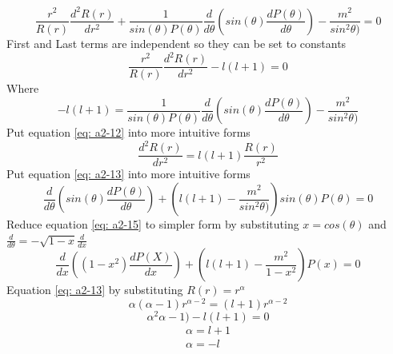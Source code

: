 \documentclass[12pt]{article}
\begin{document}
        \begin{equation} \label{eq: a2-11}
            \frac{r^2}{R(r)} \frac{d^2 R(r)}{dr^2} + \frac{1}{sin(\theta) P(\theta)} \frac{d}{d\theta}(sin(\theta) \frac{dP(\theta)}{d\theta}) - \frac{m^2}{sin^2\theta)} = 0
        \end{equation}
        First and Last terms are independent so they can be set to constants
        \begin{equation} \label{eq: a2-12}
            \frac{r^2}{R(r)} \frac{d^2 R(r)}{dr^2} - l (l+1) = 0
        \end{equation}
        Where 
        \begin{equation} \label{eq: a2-13}
            -l(l+1) = \frac{1}{sin(\theta) P(\theta)} \frac{d}{d\theta}(sin(\theta) \frac{dP(\theta)}{d\theta}) - \frac{m^2}{sin^2\theta)}
        \end{equation}
        Put equation \ref{eq: a2-12} into more intuitive forms
        \begin{equation} \label{eq: a2-14}
            \frac{d^2 R(r)}{dr^2} = l(l+1) \frac{R(r)}{r^2} 
        \end{equation}
        Put equation \ref{eq: a2-13} into more intuitive forms
        \begin{equation} \label{eq: a2-15}
            \frac{d}{d\theta} (sin(\theta) \frac{d P(\theta)}{d\theta}) + (l(l+1)-\frac{m^2}{sin^2\theta)}) sin(\theta) P(\theta) = 0
        \end{equation}
        Reduce equation \ref{eq: a2-15} to simpler form by substituting $x=cos(\theta)$ and $\frac{d}{d\theta} = -\sqrt{1-x} \frac{d}{dx}$
        \begin{equation} \label{eq: a2-16}
            \frac{d}{dx} ((1-x^2) \frac{d P(X)}{dx}) + (l(l+1)-\frac{m^2}{1-x^2}) P(x) = 0
        \end{equation}
        Equation \ref{eq: a2-13} by substituting $R(r) = r^{\alpha}$
        \begin{equation} \label{eq: a2-17}
            \alpha (\alpha - 1) r^{\alpha - 2} = (l+1) r^{\alpha - 2}
        \end{equation}    
        \begin{equation} \label{eq: a2-18}
            \alpha^2 \alpha - 1) - l(l+1) = 0
        \end{equation}        
        \begin{gather*}
            \alpha = l + 1
            \\ \alpha = -l
        \end{gather*}
\end{document}
